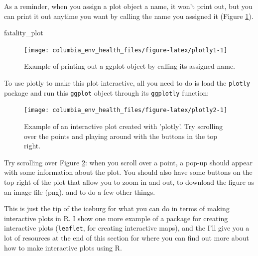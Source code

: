 \documentclass[]{tufte-book}
\newenvironment{Shaded}{}{}
\newcommand{\KeywordTok}[1]{\textcolor[rgb]{0.00,0.44,0.13}{\textbf{#1}}}
\newcommand{\NormalTok}[1]{#1}
\newcommand{\OperatorTok}[1]{\textcolor[rgb]{0.40,0.40,0.40}{#1}}
\newcommand{\StringTok}[1]{\textcolor[rgb]{0.25,0.44,0.63}{#1}}
\begin{document}
As a reminder, when you assign a plot object a name, it won't print out, but you can print
it out anytime you want by calling the name you assigned it (Figure \ref{fig:plotly1}).

\begin{Shaded}
\begin{Highlighting}[]
\NormalTok{fatality_plot}
\end{Highlighting}
\end{Shaded}

\begin{figure}
\texttt{[image: columbia\_env\_health\_files/figure-latex/plotly1-1]} \caption[Example of printing out a ggplot object by calling its assigned name]{Example of printing out a ggplot object by calling its assigned name.}\label{fig:plotly1}
\end{figure}

To use plotly to make this plot interactive, all you need to do is load the \texttt{plotly} package and
run this \texttt{ggplot} object
through its \texttt{ggplotly} function:

\begin{Shaded}
\end{Shaded}

\begin{figure}
\texttt{[image: columbia\_env\_health\_files/figure-latex/plotly2-1]} \caption[Example of an interactive plot created with 'plotly']{Example of an interactive plot created with 'plotly'. Try scrolling over the points and playing around with the buttons in the top right.}\label{fig:plotly2}
\end{figure}

Try scrolling over Figure \ref{fig:plotly2}: when you scroll over a point, a pop-up should
appear with some information about the plot. You should also have some buttons on the top
right of the plot that allow you to zoom in and out, to download the figure as an image
file (png), and to do a few other things.

This is just the tip of the iceburg for what you can do in terms of making interactive plots
in R. I show one more example of a package for creating interactive plots (\texttt{leaflet}, for
creating interactive maps), and the I'll give you a lot of resources at the end of this
section for where you can find out more about how to make interactive plots using R.
\end{document}
